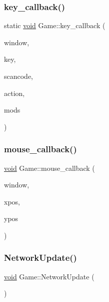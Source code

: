 \subsubsection{\texorpdfstring{key\+\_\+callback()}{key\_callback()}}
{\footnotesize\ttfamily static \hyperlink{imgui__impl__opengl3__loader_8h_ac668e7cffd9e2e9cfee428b9b2f34fa7}{void} Game\+::key\+\_\+callback (\begin{DoxyParamCaption}\item[{G\+L\+F\+Wwindow $\ast$}]{window,  }\item[{int}]{key,  }\item[{int}]{scancode,  }\item[{int}]{action,  }\item[{int}]{mods }\end{DoxyParamCaption})\hspace{0.3cm}{\ttfamily [static]}}

\mbox{\label{classGame_ade7c4fb6814172307baa622f1b4bb566}} 
\subsubsection{\texorpdfstring{mouse\+\_\+callback()}{mouse\_callback()}}
{\footnotesize\ttfamily \hyperlink{imgui__impl__opengl3__loader_8h_ac668e7cffd9e2e9cfee428b9b2f34fa7}{void} Game\+::mouse\+\_\+callback (\begin{DoxyParamCaption}\item[{G\+L\+F\+Wwindow $\ast$}]{window,  }\item[{double}]{xpos,  }\item[{double}]{ypos }\end{DoxyParamCaption})}

\mbox{\label{classGame_aad080642dbc2dcfb284e267f2c718a5c}} 
\subsubsection{\texorpdfstring{Network\+Update()}{NetworkUpdate()}}
{\footnotesize\ttfamily \hyperlink{imgui__impl__opengl3__loader_8h_ac668e7cffd9e2e9cfee428b9b2f34fa7}{void} Game\+::\+Network\+Update (\begin{DoxyParamCaption}{ }\end{DoxyParamCaption})}

